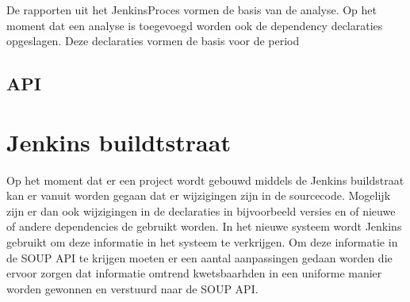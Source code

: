 De rapporten uit het JenkinsProces vormen de basis van de analyse. Op het moment dat een analyse is toegevoegd worden ook de dependency declaraties opgeslagen. Deze declaraties vormen de basis voor de period

\subsection{API}\label{subsec:api}


\section{Jenkins buildtstraat}\label{sec:jenkins-buildtstraat}
Op het moment dat er een project wordt gebouwd middels de Jenkins buildstraat kan er vanuit worden gegaan dat er wijzigingen zijn in de sourcecode. Mogelijk zijn er dan ook wijzigingen in de declaraties in bijvoorbeeld versies en of nieuwe of andere dependencies de gebruikt worden. In het nieuwe systeem wordt Jenkins gebruikt om deze informatie in het systeem te verkrijgen. Om deze informatie in de SOUP API te krijgen moeten er een aantal aanpassingen gedaan worden die ervoor zorgen dat informatie omtrend kwetsbaarhden in een uniforme manier worden gewonnen en verstuurd naar de SOUP API.

